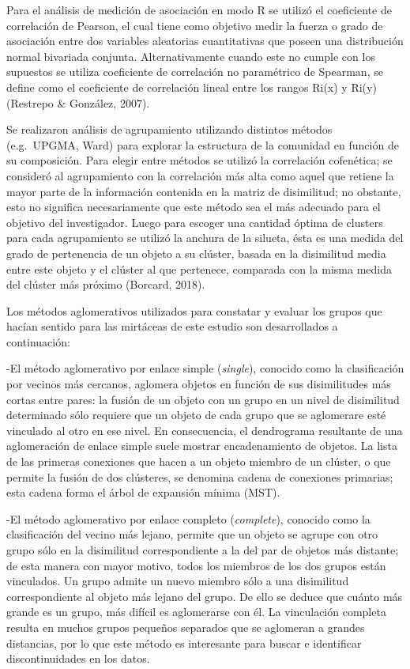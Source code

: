 \documentclass[11pt,]{article}
\begin{document}
Para el análisis de medición de asociación en modo R se utilizó el
coeficiente de correlación de Pearson, el cual tiene como objetivo medir
la fuerza o grado de asociación entre dos variables aleatorias
cuantitativas que poseen una distribución normal bivariada conjunta.
Alternativamente cuando este no cumple con los supuestos se utiliza
coeficiente de correlación no paramétrico de Spearman, se define como el
coeficiente de correlación lineal entre los rangos Ri(x) y Ri(y)
(Restrepo \& González, 2007).

Se realizaron análisis de agrupamiento utilizando distintos métodos
(e.g.~UPGMA, Ward) para explorar la estructura de la comunidad en
función de su composición. Para elegir entre métodos se utilizó la
correlación cofenética; se consideró al agrupamiento con la correlación
más alta como aquel que retiene la mayor parte de la información
contenida en la matriz de disimilitud; no obstante, esto no significa
necesariamente que este método sea el más adecuado para el objetivo del
investigador. Luego para escoger una cantidad óptima de clusters para
cada agrupamiento se utilizó la anchura de la silueta, ésta es una
medida del grado de pertenencia de un objeto a su clúster, basada en la
disimilitud media entre este objeto y el clúster al que pertenece,
comparada con la misma medida del clúster más próximo (Borcard, 2018).

Los métodos aglomerativos utilizados para constatar y evaluar los grupos
que hacían sentido para las mirtáceas de este estudio son desarrollados
a continuación:

-El método aglomerativo por enlace simple (\emph{single}), conocido como
la clasificación por vecinos más cercanos, aglomera objetos en función
de sus disimilitudes más cortas entre pares: la fusión de un objeto con
un grupo en un nivel de disimilitud determinado sólo requiere que un
objeto de cada grupo que se aglomerare esté vinculado al otro en ese
nivel. En consecuencia, el dendrograma resultante de una aglomeración de
enlace simple suele mostrar encadenamiento de objetos. La lista de las
primeras conexiones que hacen a un objeto miembro de un clúster, o que
permite la fusión de dos clústeres, se denomina cadena de conexiones
primarias; esta cadena forma el árbol de expansión mínima (MST).

-El método aglomerativo por enlace completo (\emph{complete}), conocido
como la clasificación del vecino más lejano, permite que un objeto se
agrupe con otro grupo sólo en la disimilitud correspondiente a la del
par de objetos más distante; de esta manera con mayor motivo, todos los
miembros de los dos grupos están vinculados. Un grupo admite un nuevo
miembro sólo a una disimilitud correspondiente al objeto más lejano del
grupo. De ello se deduce que cuánto más grande es un grupo, más difícil
es aglomerarse con él. La vinculación completa resulta en muchos grupos
pequeños separados que se aglomeran a grandes distancias, por lo que
este método es interesante para buscar e identificar discontinuidades en
los datos.
\end{document}
